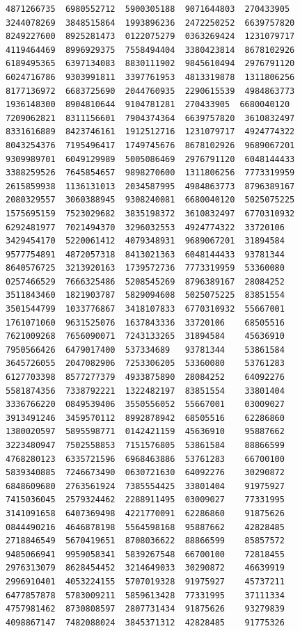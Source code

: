 \documentclass[10pt,a4paper]{article}
\begin{document}
\begin{verbatim}
4871266735  6980552712  5900305188  9071644803  270433905
3244078269  3848515864  1993896236  2472250252  6639757820
8249227600  8925281473  0122075279  0363269424  1231079717
4119464469  8996929375  7558494404  3380423814  8678102926
6189495365  6397134083  8830111902  9845610494  2976791120
6024716786  9303991811  3397761953  4813319878  1311806256
8177136972  6683725690  2044760935  2290615539  4984863773
1936148300  8904810644  9104781281  270433905  6680040120
7209062821  8311156601  7904374364  6639757820  3610832497
8331616889  8423746161  1912512716  1231079717  4924774322
8043254376  7195496417  1749745676  8678102926  9689067201
9309989701  6049129989  5005086469  2976791120  6048144433
3388259526  7645854657  9898270600  1311806256  7773319959
2615859938  1136131013  2034587995  4984863773  8796389167
2080329557  3060388945  9308240081  6680040120  5025075225
1575695159  7523029682  3835198372  3610832497  6770310932
6292481977  7021494370  3296032553  4924774322  33720106
3429454170  5220061412  4079348931  9689067201  31894584
9577754891  4872057318  8413021363  6048144433  93781344
8640576725  3213920163  1739572736  7773319959  53360080
0257466529  7666325486  5208545269  8796389167  28084252
3511843460  1821903787  5829094608  5025075225  83851554
3501544799  1033776867  3418107833  6770310932  55667001
1761071060  9631525076  1637843336  33720106    68505516
7621009268  7656090071  7243133265  31894584    45636910
7950566426  6479017400  537334689   93781344    53861584
3645726055  2047082906  7253306205  53360080    53761283
6127703398  8577277379  4933875890  28084252    64092276
5581874356  7338792221  1322482197  83851554    33801404
3336766220  0849539406  3550556052  55667001    03009027
3913491246  3459570112  8992878942  68505516    62286860
1380020597  5895598771  0142421159  45636910    95887662
3223480947  7502558853  7151576805  53861584    88866599
4768280123  6335721596  6968463886  53761283    66700100
5839340885  7246673490  0630721630  64092276    30290872
6848609680  2763561924  7385554425  33801404    91975927
7415036045  2579324462  2288911495  03009027    77331995
3141091658  6407369498  4221770091  62286860    91875626
0844490216  4646878198  5564598168  95887662    42828485
2718846549  5670419651  8708036622  88866599    85857572
9485066941  9959058341  5839267548  66700100    72818455
2976313079  8628454452  3214649033  30290872    46639919
2996910401  4053224155  5707019328  91975927    45737211
6477857878  5783009211  5859613428  77331995    37111334
4757981462  8730808597  2807731434  91875626    93279839
4098867147  7482088024  3845371312  42828485    91775326

\end{verbatim}
\end{document}
